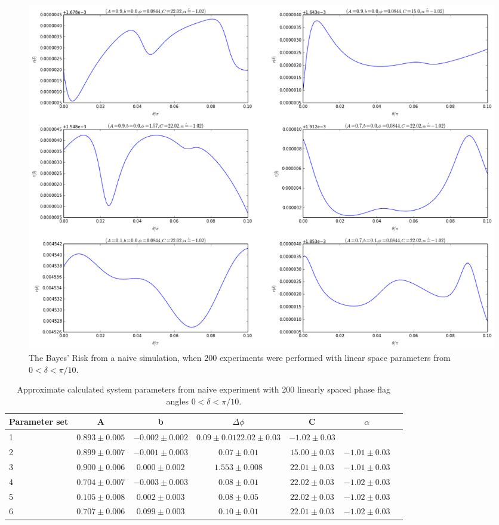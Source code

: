 \begin{figure}[ht!]
\centering
\includegraphics[width=\textwidth , height=0.8\textheight]{Figures/naive200.png}
\caption{The Bayes' Risk from a naive simulation, when 200 experiments were performed with linear space parameters from $0<\delta<\pi/10$.}
\label{fig:naive200}
\end{figure}
\begin{table}[h]
\tiny
\begin{center}
\begin{tabular}{l*{5}{c}r}
Parameter set & A&b& $\Delta\phi$ & C & $\alpha$ \\
\hline

1&$0.893 ± 0.005$&$	 -0.002 ± 0.002	$&$	 0.09 ± 0.01	 22.02 ± 0.03	$&$	 -1.02 ± 0.03$\\

2&$0.899 ± 0.007	$&$	 -0.001 ± 0.003$&$		 0.07± 0.01	$&$	 15.00 ± 0.03	$&$	 -1.01 ± 0.03$\\	

3& $0.900 ± 0.006$&$		 0.000 ± 0.002	$&$	 1.553 ± 0.008$&$	 22.01 ± 0.03$&$	 -1.01 ± 0.03$ \\	

4&$0.704 ± 0.007	$&$	 -0.003 ± 0.003	$&$	 0.08 ± 0.01	$&$	 22.02 ± 0.03	$&$	 -1.02 ± 0.03$ \\

5&$0.105 ± 0.008	 $&$	0.002 ± 0.003$&$		 0.08 ± 0.05	 $&$	22.02 ± 0.03	$&$	 -1.02 ± 0.03$ \\

6&$0.707 ± 0.006	$&$	 0.099 ± 0.003	$&$	 0.10 ± 0.01	$&$	 22.01 ± 0.03$&$		 -1.02 ± 0.03$\\	

\end{tabular}
\caption{Approximate calculated system parameters from naive experiment with 200 linearly spaced phase flag angles $0<\delta<\pi/10$.}
\label{tab:naive200}
\end{center}
\end{table}
